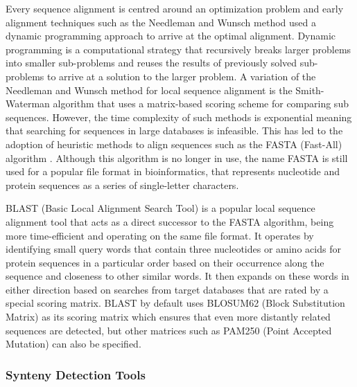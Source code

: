 Every sequence alignment is centred around an optimization problem and early alignment techniques such as the Needleman and Wunsch method \cite{needleman1970general} used a dynamic programming approach to arrive at the optimal alignment. Dynamic programming is a computational strategy that recursively breaks larger problems into smaller sub-problems and reuses the results of previously solved sub-problems to arrive at a solution to the larger problem. A variation of the Needleman and Wunsch method for local sequence alignment is the Smith-Waterman algorithm\cite{smith1981identification} that uses a matrix-based scoring scheme for comparing sub sequences.
However, the time complexity of such methods is exponential meaning that searching for sequences in large databases is infeasible. This has led to the adoption of heuristic methods to align sequences such as the FASTA (Fast-All) algorithm \cite{lipman1985rapid}. Although this algorithm is no longer in use, the name FASTA is still used for a popular file format in bioinformatics, that represents nucleotide and protein sequences as a series of single-letter characters.

BLAST (Basic Local Alignment Search Tool) is a popular local sequence alignment tool that acts as a direct successor to the FASTA algorithm, being more time-efficient and operating on the same file format\cite{pertsemlidis2001having}. It operates by identifying small query words that contain three nucleotides or amino acids for protein sequences in a particular order based on their occurrence along the sequence and closeness to other similar words. It then expands on these words in  either direction based on searches from target databases that are rated by a special scoring matrix. BLAST by default uses BLOSUM62 (Block Substitution Matrix) as its scoring matrix which ensures that even more distantly related sequences are detected, but other matrices such as PAM250 (Point Accepted Mutation) can also be specified.



\subsubsection{Synteny Detection Tools}

